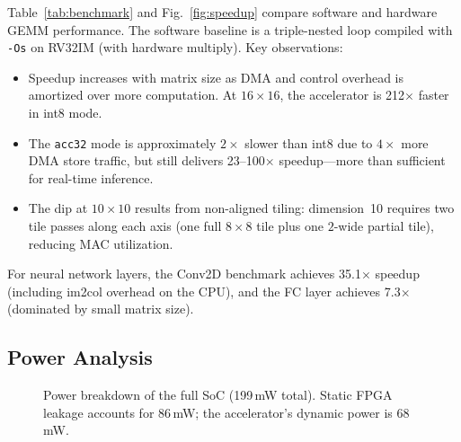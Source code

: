 \documentclass[conference]{IEEEtran}
\begin{document}
Table~\ref{tab:benchmark} and Fig.~\ref{fig:speedup} compare software and hardware GEMM performance. The software baseline is a triple-nested loop compiled with \texttt{-Os} on RV32IM (with hardware multiply). Key observations:

\begin{itemize}
    \item Speedup increases with matrix size as DMA and control overhead is amortized over more computation. At $16{\times}16$, the accelerator is 212$\times$ faster in int8 mode.
    \item The \texttt{acc32} mode is approximately $2\times$ slower than int8 due to $4\times$ more DMA store traffic, but still delivers 23--100$\times$ speedup---more than sufficient for real-time inference.
    \item The dip at $10{\times}10$ results from non-aligned tiling: dimension~10 requires two tile passes along each axis (one full $8{\times}8$ tile plus one $2$-wide partial tile), reducing MAC utilization.
\end{itemize}

For neural network layers, the Conv2D benchmark achieves 35.1$\times$ speedup (including im2col overhead on the CPU), and the FC layer achieves 7.3$\times$ (dominated by small matrix size).

\subsection{Power Analysis}

\begin{figure}[t]
\centering
{}
\caption{Power breakdown of the full SoC (199\,mW total). Static FPGA leakage accounts for 86\,mW; the accelerator's dynamic power is 68\,mW.}
\label{fig:power}
\end{figure}
\end{document}
